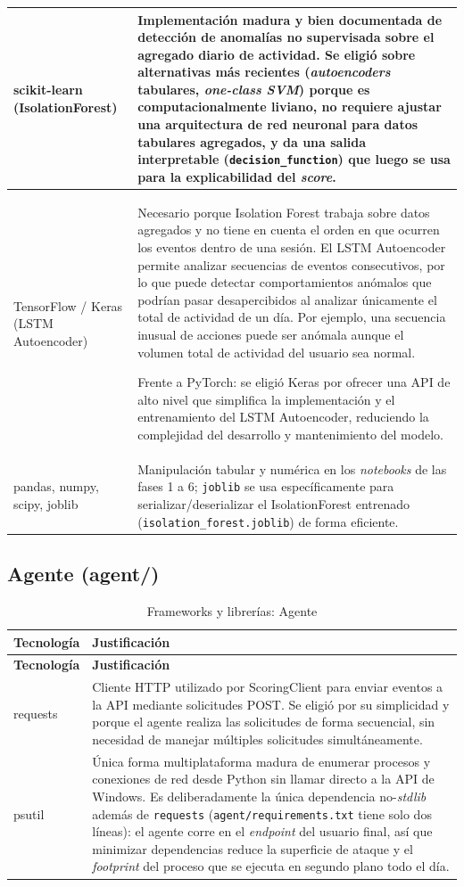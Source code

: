 \begin{longtable}{p{3cm}p{11.6cm}}
	\hline
	scikit-learn (IsolationForest) & Implementación madura y bien documentada de detección de anomalías no supervisada sobre el agregado diario de actividad. Se eligió sobre alternativas más recientes (\emph{autoencoders} tabulares, \emph{one-class SVM}) porque es computacionalmente liviano, no requiere ajustar una arquitectura de red neuronal para datos tabulares agregados, y da una salida interpretable (\texttt{decision\_function}) que luego se usa para la explicabilidad del \emph{score}. \\
	\hline
	TensorFlow / Keras (LSTM Autoencoder) & Necesario porque Isolation Forest trabaja sobre datos agregados y no tiene en cuenta el orden en que ocurren los eventos dentro de una sesión. El LSTM Autoencoder permite analizar secuencias de eventos consecutivos, por lo que puede detectar comportamientos anómalos que podrían pasar desapercibidos al analizar únicamente el total de actividad de un día. Por ejemplo, una secuencia inusual de acciones puede ser anómala aunque el volumen total de actividad del usuario sea normal.

Frente a PyTorch: se eligió Keras por ofrecer una API de alto nivel que simplifica la implementación y el entrenamiento del LSTM Autoencoder, reduciendo la complejidad del desarrollo y mantenimiento del modelo. \\
	\hline
	pandas, numpy, scipy, joblib & Manipulación tabular y numérica en los \emph{notebooks} de las fases 1 a 6; \texttt{joblib} se usa específicamente para serializar/deserializar el IsolationForest entrenado (\texttt{isolation\_forest.joblib}) de forma eficiente. \\
	\hline
\end{longtable}

\subsection{Agente (agent/)}
\begin{longtable}{p{3cm}p{11.6cm}}
	\caption{Frameworks y librerías: Agente}
	\label{tab:frameworks-agente}\\
	\hline
	\textbf{Tecnología} & \textbf{Justificación} \\
	\hline
	\endfirsthead
	\hline
	\textbf{Tecnología} & \textbf{Justificación} \\
	\hline
	\endhead
	requests & Cliente HTTP utilizado por ScoringClient para enviar eventos a la API mediante solicitudes POST. Se eligió por su simplicidad y porque el agente realiza las solicitudes de forma secuencial, sin necesidad de manejar múltiples solicitudes simultáneamente. \\
	\hline
	psutil & Única forma multiplataforma madura de enumerar procesos y conexiones de red desde Python sin llamar directo a la API de Windows. Es deliberadamente la única dependencia no-\emph{stdlib} además de \texttt{requests} (\texttt{agent/requirements.txt} tiene solo dos líneas): el agente corre en el \emph{endpoint} del usuario final, así que minimizar dependencias reduce la superficie de ataque y el \emph{footprint} del proceso que se ejecuta en segundo plano todo el día. \\
	\hline
\end{longtable}

